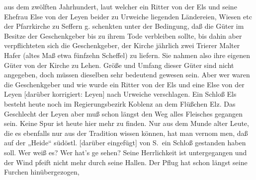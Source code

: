 

%
aus dem zwölften Jahrhundert, laut welcher ein Ritter\ob
von der Els und seine Ehefrau Else von der\ob
Leyen beider zu Urweiche liegenden Ländereien,\ob
Wiesen etc der Pfarrkirche zu\unsicher{} Seffern g. schenkten\ob
unter der Bedingung, daß die Güter im Besitze der\ob
Geschenkgeber bis zu ihrem Tode verbleiben sollte,\ob
bis dahin aber verpflichteten sich die Geschenkgeber,\ob
der Kirche jährlich zwei Trierer Malter Hafer (altes\ob
Maß etwa fünfzehn Scheffel) zu liefern. Sie nahmen\ob
also ihre eigenen Güter von der Kirche zu Lehen. Größe\ob
und Umfang dieser Güter sind nicht angegeben, doch\ob
müssen dieselben sehr bedeutend  gewesen sein. Aber\ob
wer waren die Geschenkgeber und wie wurde ein\ob
Ritter von der Els und eine Else von der Leyen [darüber korrigiert: Leyen]\ob
nach Urweiche verschlagen. Ein Schloß Els besteht\ob
heute noch im Regierungsbezirk Koblenz an dem\ob
Flüßchen Elz. Das Geschlecht der Leyen aber muß\ob
schon längst den Weg alles Fleisches gegangen sein.\ob
Keine Spur ist heute hier mehr zu finden. Nur aus\ob
dem Munde alter Leute, die es ebenfalls nur aus\ob
der Tradition wissen können, hat man vernom\ohb
men, daß auf der „Heide“ südöstl. [darüber eingefügt] von S.\ ein Schloß\ob
gestanden haben soll. Wer weiß es? Wer hat's ge\ohb
sehen? Seine Herrlichkeit ist untergegangen und\ob
der Wind pfeift nicht mehr durch seine Hallen. Der\ob
Pflug hat schon längst seine Furchen hinübergezogen,
\pend
